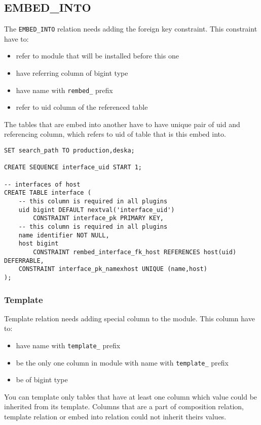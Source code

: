 \documentclass[deska]{subfiles}
\begin{document}
\subsection{EMBED\_INTO}
The {\tt EMBED\_INTO} relation needs adding the foreign key constraint. This constraint have to:
\begin{itemize}
    \item refer to module that will be installed before this one
    \item have referring column of bigint type
    \item have name with {\tt rembed\_} prefix
    \item refer to uid column of the referenced table
\end{itemize}
The tables that are embed into another have to have unique pair of uid and referencing column, which refers to uid of table that is this embed into.
\begin{verbatim}
SET search_path TO production,deska;

CREATE SEQUENCE interface_uid START 1;

-- interfaces of host
CREATE TABLE interface (
    -- this column is required in all plugins
    uid bigint DEFAULT nextval('interface_uid')
        CONSTRAINT interface_pk PRIMARY KEY,
    -- this column is required in all plugins
    name identifier NOT NULL,
    host bigint
        CONSTRAINT rembed_interface_fk_host REFERENCES host(uid) DEFERRABLE,
    CONSTRAINT interface_pk_namexhost UNIQUE (name,host)
);
\end{verbatim}



\subsubsection{Template}
Template relation needs adding special column to the module. This column have to:
\begin{itemize}
    \item have name with {\tt template\_} prefix
    \item be the only one column in module with name with {\tt template\_} prefix
    \item be of bigint type
\end{itemize}
You can template only tables that have at least one column which value could be inherited from its template. Columns that are a part of composition relation, template relation or embed into relation could not inherit theirs values.
\end{document}
